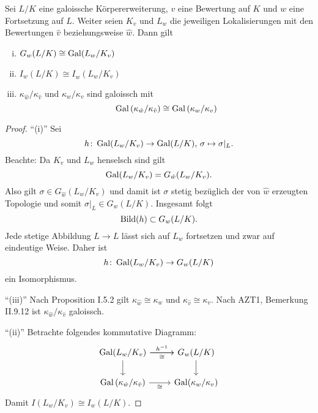 \begin{Satz}
	Sei $L/K$ eine galoissche Körpererweiterung, $v$ eine Bewertung auf $K$ und $w$ eine Fortsetzung auf $L$. Weiter seien $K_v$ und $L_w$ die jeweiligen Lokalisierungen mit den Bewertungen $\hat{v}$ beziehungsweise $\hat{w}$. Dann gilt
	\begin{enumerate}[(i)]
		\item $G_w(L/K) \cong \operatorname{Gal}(L_w/K_v)$
		\item $I_w(L/K) \cong I_{\hat{w}}(L_w/K_v)$
		\item $\kappa_{\hat{w}} / \kappa_{\hat{v}}$ und $\kappa_w / \kappa_v$ sind galoissch mit
		\[ \operatorname{Gal} \left( \kappa_{\hat{w}} / \kappa_{\hat{v}} \right)
		\cong \operatorname{Gal} \left( \kappa_w / \kappa_v \right)
		\]
	\end{enumerate}
\end{Satz}

\begin{proof}
	\enquote{(i)} Sei
	\[ h \colon \operatorname{Gal}(L_w/K_v) \to \operatorname{Gal}(L/K), \, \sigma \mapsto \sigma|_L.
	\]
	Beachte: Da $K_v$ und $L_w$ henselsch sind gilt
	\[ \operatorname{Gal}(L_w/K_v)=G_{\hat{w}}(L_w/K_v).
	\]
	Also gilt $\sigma \in G_{\hat{w}}(L_w/K_v)$ und damit ist $\sigma$ stetig bezüglich der von $\hat{w}$ erzeugten Topologie und somit $\sigma|_L \in G_w(L/K)$.
	Insgesamt folgt
	\[ \operatorname{Bild} (h) \subset G_w(L/K).
	\]
	Jede stetige Abbildung $L\to L$ lässt sich auf $L_w$ fortsetzen und zwar auf eindeutige Weise.
	Daher ist
	\[ h \colon \operatorname{Gal}(L_w/K_v) \to G_w(L/K)
	\]
	ein Isomorphismus.
	
	\bigskip \enquote{(iii)}
	Nach Proposition I.5.2 gilt $\kappa_{\hat{w}} \cong \kappa_w$ und $\kappa_{\hat{v}} \cong \kappa_v$. Nach AZT1, Bemerkung II.9.12 ist $\kappa_{\hat{w}} / \kappa_{\hat{v}}$ galoissch.
	
	\bigskip \enquote{(ii)}
	Betrachte folgendes kommutative Diagramm:
	\[ \begin{tikzcd}
	\Gal(L_w/K_v)
		\arrow{r}{h^{-1}}
		\arrow[swap]{r}{\cong}
		\arrow{d}
	& G_w(L/K)
		\arrow{d}
	\\
	\Gal\left(  \kappa_{\hat{w}} / \kappa_{\hat{v}} \right)
		\arrow[swap]{r}{\cong}
	& \Gal(\kappa_w / \kappa_v)
	\end{tikzcd}
	\]
	Damit $I(L_w/K_v) \cong I_w(L/K)$.
\end{proof}

